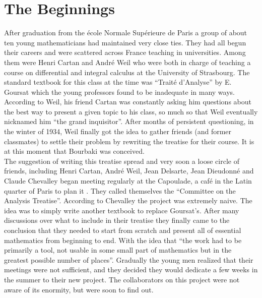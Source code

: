 \documentclass[12pt]{article}
\begin{document}
\section*{The Beginnings}\normalsize

After graduation from the \'ecole Normale Sup\'erieure de Paris a group of 
about ten young mathematicians had maintained very close ties.\cite{WA} 
They had all begun their careers and  were scattered across France teaching 
in universities. Among them were Henri Cartan and Andr\'e Weil who were both 
in charge of teaching a course on differential and integral calculus at the 
University of Strasbourg. The standard textbook for this class at the time was 
``Trait\'e d'Analyse'' by E. Goursat which the young professors found to be 
inadequate in many ways.\cite{BA} According to Weil, his friend Cartan was 
constantly asking him questions about the best way to present a given topic to 
his class, so much so that Weil eventually nicknamed him ``the grand 
inquisitor''.\cite{WA} After months of persistent questioning, in the winter 
of 1934, Weil finally got the idea to gather friends (and former classmates) 
to settle their problem by rewriting the treatise for their course. It is at 
this moment that Bourbaki was conceived.\\


The suggestion of writing this treatise spread and very soon a loose circle 
of friends, including Henri Cartan, Andr\'e Weil, Jean Delsarte, Jean 
Dieudonn\'e and Claude Chevalley began meeting regularly at the Capoulade, 
a caf\'e in the Latin quarter of Paris to plan it . They called themselves 
the ``Committee on the Analysis Treatise''\cite{BL}. According to Chevalley 
the project was extremely naive. The idea was to simply write another textbook 
to replace Goursat's.\cite{GD} After many discussions over what to include in 
their treatise they finally came to the conclusion that they needed to start 
from scratch and present all of essential mathematics from beginning to end. 
With the idea that ``the work had to be primarily a tool, not usable in some 
small part of mathematics but in the greatest possible number of places''.
\cite{DJ} Gradually the young men realized that their meetings were not 
sufficient, and they decided they would dedicate a few weeks in the summer 
to their new project. The collaborators on this project were not aware of 
its enormity, but were soon to find out.\\
\end{document}
